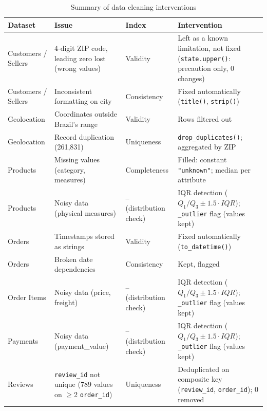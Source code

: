 \documentclass[12pt,a4paper]{article}
\begin{document}
\begin{table}[H]
  \centering
  \caption{Summary of data cleaning interventions}
  \label{tab:cleaning}
  \begin{tabular}{>{\raggedright}p{2.5cm}
                  >{\raggedright}p{3.5cm}
                  >{\raggedright}p{2.5cm}
                  >{\raggedright\arraybackslash}p{4cm}}
    \toprule
    \textbf{Dataset} & \textbf{Issue} & \textbf{Index} & \textbf{Intervention} \\
    \midrule
    Customers / Sellers & 4-digit ZIP code, leading zero lost (wrong values) & Validity &
      Left as a known limitation, not fixed (\texttt{state.upper()}: precaution only, 0 changes) \\
    Customers / Sellers & Inconsistent formatting on city & Consistency &
      Fixed automatically (\texttt{title()}, \texttt{strip()}) \\
    Geolocation & Coordinates outside Brazil's range & Validity &
      Rows filtered out \\
    Geolocation & Record duplication (261,831) & Uniqueness &
      \texttt{drop\_duplicates()}; aggregated by ZIP \\
    Products & Missing values (category, measures) & Completeness &
      Filled: constant \texttt{"unknown"}; median per attribute \\
    Products & Noisy data (physical measures) & -- (distribution check) &
      IQR detection ($Q_1/Q_3 \pm 1.5 \cdot IQR$); \texttt{\_outlier} flag (values kept) \\
    Orders & Timestamps stored as strings & Validity &
      Fixed automatically (\texttt{to\_datetime()}) \\
    Orders & Broken date dependencies & Consistency &
      Kept, flagged \\
    Order Items & Noisy data (price, freight) & -- (distribution check) &
      IQR detection ($Q_1/Q_3 \pm 1.5 \cdot IQR$); \texttt{\_outlier} flag (values kept) \\
    Payments & Noisy data (payment\_value) & -- (distribution check) &
      IQR detection ($Q_1/Q_3 \pm 1.5 \cdot IQR$); \texttt{\_outlier} flag (values kept) \\
    Reviews & \texttt{review\_id} not unique (789 values on $\geq$2 \texttt{order\_id}) & Uniqueness &
      Deduplicated on composite key (\texttt{review\_id}, \texttt{order\_id}); 0 removed \\
    \bottomrule
  \end{tabular}
\end{table}
\end{document}
